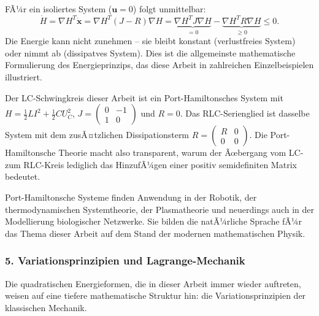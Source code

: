 ﻿\documentclass[12pt, a4paper]{article}
\begin{document}
	FÃ¼r ein isoliertes System ($\mathbf{u} = 0$) folgt unmittelbar:
	\begin{equation}
		\dot{H} = \nabla H^T \dot{\mathbf{x}} = \nabla H^T (J - R) \nabla H = \underbrace{\nabla H^T J \nabla H}_{= 0} - \underbrace{\nabla H^T R \nabla H}_{\geq 0} \leq 0.
	\end{equation}
	Die Energie kann nicht zunehmen -- sie bleibt konstant (verlustfreies System) oder nimmt ab (dissipatves System). Dies ist die allgemeinste mathematische Formulierung des Energieprinzips, das diese Arbeit in zahlreichen Einzelbeispielen illustriert.

	Der LC-Schwingkreis dieser Arbeit ist ein Port-Hamiltonsches System mit $H = \frac{1}{2}LI^2 + \frac{1}{2}CU_C^2$, $J = \begin{pmatrix}0 & -1 \\ 1 & 0\end{pmatrix}$ und $R = 0$. Das RLC-Serienglied ist dasselbe System mit dem zusÃ¤tzlichen Dissipationsterm $R = \begin{pmatrix}R & 0 \\ 0 & 0\end{pmatrix}$. Die Port-Hamiltonsche Theorie macht also transparent, warum der Ãœbergang vom LC- zum RLC-Kreis lediglich das HinzufÃ¼gen einer positiv semidefiniten Matrix bedeutet.

	Port-Hamiltonsche Systeme finden Anwendung in der Robotik, der thermodynamischen Systemtheorie, der Plasmatheorie und neuerdings auch in der Modellierung biologischer Netzwerke. Sie bilden die natÃ¼rliche Sprache fÃ¼r das Thema dieser Arbeit auf dem Stand der modernen mathematischen Physik.

	\subsubsection*{5. \quad Variationsprinzipien und Lagrange-Mechanik}

	Die quadratischen Energieformen, die in dieser Arbeit immer wieder auftreten, weisen auf eine tiefere mathematische Struktur hin: die Variationsprinzipien der klassischen Mechanik.
\end{document}
